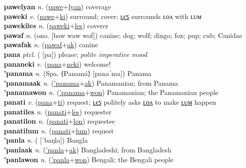 \textbf{pawelyan} \textit{n.} (\hyperref[pawe]{pawe}+\hyperref[lyan]{lyan})
coverage \label{pawelyan} \\
\textbf{paweki} \textit{v.} (\hyperref[pawe]{pawe}+\hyperref[ki]{ki})
surround; cover; \hyperref[pawekiles]{ʟєꜱ} surrounds ʟᴏᴧ with ʟᴜᴍ \label{paweki} \\
\textbf{pawekiles} \textit{n.} (\hyperref[paweki]{paweki}+\hyperref[les]{les})
coverer \label{pawekiles} \\
\textbf{pawaf} \textit{n.} (ono. [baw waw wof])
canine; dog; wolf; dingo; fox; pup; cub; Canidae \label{pawaf} \\
\textbf{pawafak} \textit{n.} (\hyperref[pawaf]{pawaf}+\hyperref[ak]{ak})
canine \label{pawafak} \\
\textbf{pana} \textit{ptcl.} ( [pa])
please; \textit{polite imperative mood} \label{pana} \\
\textbf{pananeki} \textit{v.} (\hyperref[pana]{pana}+\hyperref[neki]{neki})
welcome! \label{pananeki} \\
\textbf{'panama} \textit{n.} (Spa. ⟨Panamá⟩ [panaˈma])
Panama \label{'panama} \\
\textbf{'panamaak} \textit{n.} (\hyperref['panama]{'panama}+\hyperref[ak]{ak})
Panamanian; from Panama \label{'panamaak} \\
\textbf{'panamawon} \textit{n.} (\hyperref['panama]{'panama}+\hyperref[won]{won})
Panamanian; the Panamanian people \label{'panamawon} \\
\textbf{panati} \textit{v.} (\hyperref[pana]{pana}+\hyperref[ti]{ti})
request; \hyperref[panatiles]{ʟєꜱ} politely asks \hyperref[panatilon]{ʟᴏᴧ} to make \hyperref[panatilum]{ʟᴜᴍ} happen \label{panati} \\
\textbf{panatiles} \textit{n.} (\hyperref[panati]{panati}+\hyperref[les]{les})
requester \label{panatiles} \\
\textbf{panatilon} \textit{n.} (\hyperref[panati]{panati}+\hyperref[lon]{lon})
requestee \label{panatilon} \\
\textbf{panatilum} \textit{n.} (\hyperref[panati]{panati}+\hyperref[lum]{lum})
request \label{panatilum} \\
\textbf{'panla} \textit{n.} ( [ˈbaŋla])
Bangla \label{'panla} \\
\textbf{'panlaak} \textit{n.} (\hyperref['panla]{'panla}+\hyperref[ak]{ak})
Bangladeshi; from Bangladesh \label{'panlaak} \\
\textbf{'panlawon} \textit{n.} (\hyperref['panla]{'panla}+\hyperref[won]{won})
Bengali; the Bengali people \label{'panlawon} \\
